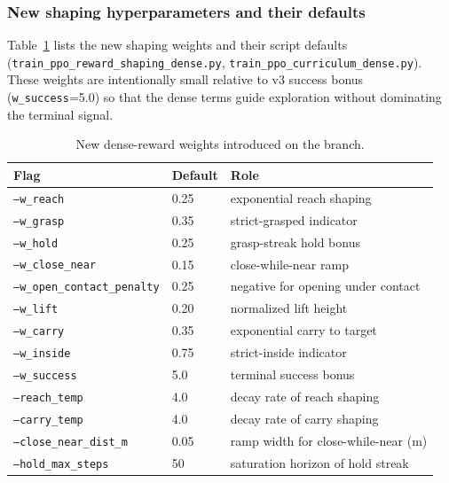 \documentclass[11pt]{article}
\begin{document}
\subsubsection*{New shaping hyperparameters and their defaults}
Table~\ref{tab:new-shaping} lists the new shaping weights and their script
defaults (\texttt{train\_ppo\_reward\_shaping\_dense.py},
\texttt{train\_ppo\_curriculum\_dense.py}). These weights are intentionally
small relative to v3 success bonus (\texttt{w\_success}=5.0) so that the dense
terms guide exploration without dominating the terminal signal.

\begin{table}[h]
\centering
\caption{New dense-reward weights introduced on the branch.}
\label{tab:new-shaping}
\begin{tabular}{lll}
\toprule
Flag & Default & Role \\
\midrule
\texttt{--w\_reach}                 & 0.25 & exponential reach shaping \\
\texttt{--w\_grasp}                 & 0.35 & strict-grasped indicator \\
\texttt{--w\_hold}                  & 0.25 & grasp-streak hold bonus \\
\texttt{--w\_close\_near}           & 0.15 & close-while-near ramp \\
\texttt{--w\_open\_contact\_penalty}& 0.25 & negative for opening under contact \\
\texttt{--w\_lift}                  & 0.20 & normalized lift height \\
\texttt{--w\_carry}                 & 0.35 & exponential carry to target \\
\texttt{--w\_inside}                & 0.75 & strict-inside indicator \\
\texttt{--w\_success}               & 5.0  & terminal success bonus \\
\texttt{--reach\_temp}              & 4.0  & decay rate of reach shaping \\
\texttt{--carry\_temp}              & 4.0  & decay rate of carry shaping \\
\texttt{--close\_near\_dist\_m}     & 0.05 & ramp width for close-while-near (m) \\
\texttt{--hold\_max\_steps}         & 50   & saturation horizon of hold streak \\
\bottomrule
\end{tabular}
\end{table}
\end{document}
